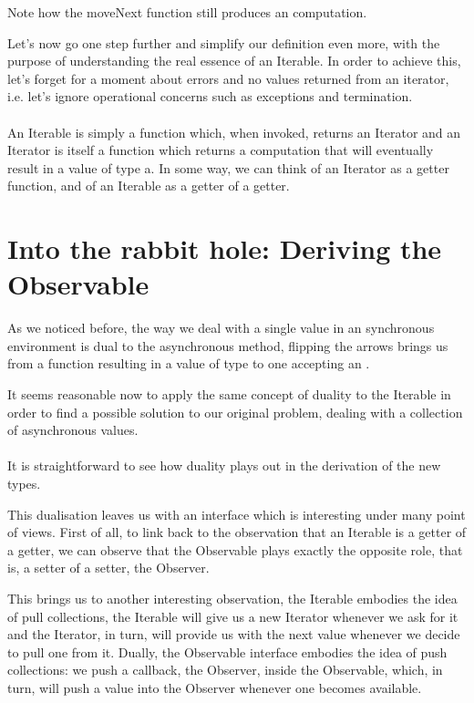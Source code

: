 Note how the moveNext function still produces an  computation.

Let's now go one step further and simplify our definition even more, with the purpose of understanding the real essence of an Iterable. In order to achieve this, let's forget for a moment about errors and no values returned from an iterator, i.e. let's ignore operational concerns such as exceptions and termination.\\

\\

An Iterable is simply a function which, when invoked, returns an Iterator and an Iterator is itself a function which returns a computation that will eventually result in a value of type a. In some way, we can think of an Iterator as a getter function, and of an Iterable as a getter of a getter.

\section{Into the rabbit hole: Deriving the Observable}
\label{sec:sec02}

As we noticed before, the way we deal with a single value in an synchronous environment is dual to the asynchronous method, flipping the arrows brings us from a function resulting in a value of type  to one accepting an . 

It seems reasonable now to apply the same concept of duality to the Iterable in order to find a possible solution to our original problem, dealing with a collection of asynchronous values.\\

\\

It is straightforward to see how duality plays out in the derivation of the new types.

This dualisation leaves us with an interface which is interesting under many point of views. First of all, to link back to the observation that an Iterable is a getter of a getter, we can observe that the Observable plays exactly the opposite role, that is, a setter of a setter, the Observer. 

This brings us to another interesting observation, the Iterable embodies the idea of pull collections, the Iterable will give us a new Iterator whenever we ask for it and the Iterator, in turn, will provide us with the next value whenever we decide to pull one from it. Dually, the Observable interface embodies the idea of push collections: we push a callback, the Observer, inside the Observable, which, in turn, will push a value into the Observer whenever one becomes available. 

